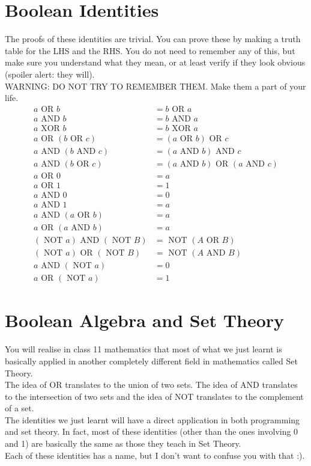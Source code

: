 \documentclass[letterpaper, 12pt]{book}
\begin{document}
\section{Boolean Identities}
The proofs of these identities are trivial. You can prove these by making a truth table for the LHS and the RHS. You do not need to remember any of this, but make sure you understand what they mean, or at least verify if they look obvious (spoiler alert: they will).\\
WARNING: DO NOT TRY TO REMEMBER THEM. Make them a part of your life.
\begin{align}
a \text{ OR } b &= b \text{ OR } a\\
a \text{ AND } b &= b \text{ AND } a\\
a \text{ XOR } b &= b \text{ XOR } a\\
a \text{ OR } (b \text{ OR } c) &= (a \text{ OR } b) \text{ OR } c\\
a \text{ AND } (b \text{ AND } c) &= (a \text{ AND } b) \text{ AND } c\\
a \text{ AND } (b \text{ OR } c) &= (a \text{ AND } b) \text{ OR } (a \text{ AND } c)\\
a \text{ OR } 0 &= a\\
a \text{ OR } 1 &= 1\\
a \text{ AND } 0 &= 0\\
a \text{ AND } 1 &= a\\
a \text{ AND } (a \text{ OR } b) &= a\\
a \text{ OR } (a \text{ AND } b) &= a\\
(\text{ NOT } a) \text{ AND } (\text{ NOT } B) &= \text{ NOT }(A \text{ OR } B)\\
(\text{ NOT } a) \text{ OR } (\text{ NOT } B) &= \text{ NOT }(A \text{ AND } B)\\
a \text{ AND } (\text{ NOT } a) &= 0\\
a \text{ OR } (\text{ NOT } a) &= 1
\end{align}
\section{Boolean Algebra and Set Theory}
You will realise in class 11 mathematics that most of what we just learnt is basically applied in another completely different field in mathematics called Set Theory.\\
The idea of OR translates to the union of two sets. The idea of AND translates to the intersection of two sets and the idea of NOT translates to the complement of a set.\\
The identities we just learnt will have a direct application in both programming and set theory. In fact, most of these identities (other than the ones involving 0 and 1) are basically the same as those they teach in Set Theory.\\
Each of these identities has a name, but I don't want to confuse you with that :).
\end{document}
